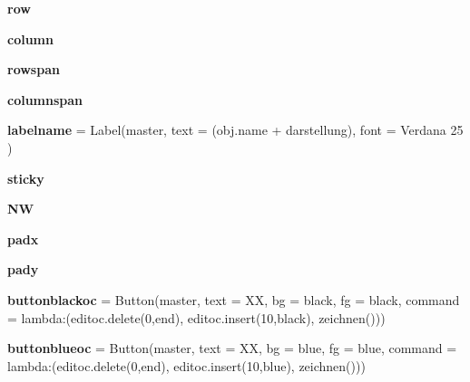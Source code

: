 \begin{DoxyCompactItemize}
\mbox{\label{namespacelatest_abffff8924b3914c7bb914f52eaea798d}} 
{\bfseries row}
\item 
\mbox{\label{namespacelatest_a7cb7a50dbe3c11f25ecb59c589ed31e2}} 
{\bfseries column}
\item 
\mbox{\label{namespacelatest_aaaa697c0f23a70eb61457ba02340661f}} 
{\bfseries rowspan}
\item 
\mbox{\label{namespacelatest_ae8a1bd2d833c82ed64fa953baaf500b2}} 
{\bfseries columnspan}
\item 
\mbox{\label{namespacelatest_adfae089fb243b971880144e27029bf6c}} 
{\bfseries labelname} = Label(master, text = (obj.\+name + \textquotesingle{}darstellung\textquotesingle{}), font = \textquotesingle{}Verdana 25\textquotesingle{} )
\item 
\mbox{\label{namespacelatest_a84aa4983ea2af0c939019553139b3f04}} 
{\bfseries sticky}
\item 
\mbox{\label{namespacelatest_a888a4bbfe49e70831985214772fc599a}} 
{\bfseries NW}
\item 
\mbox{\label{namespacelatest_a3930271e7cea64541ead22da5ed64a28}} 
{\bfseries padx}
\item 
\mbox{\label{namespacelatest_afdfc453b9a8de650d8b3aab157b0cf5e}} 
{\bfseries pady}
\item 
\mbox{\label{namespacelatest_af3023f7901f732bf38a92be66ec21676}} 
{\bfseries buttonblackoc} = Button(master, text = \textquotesingle{}XX\textquotesingle{}, bg = \textquotesingle{}black\textquotesingle{}, fg = \textquotesingle{}black\textquotesingle{}, command = lambda\+:(editoc.\+delete(0,\textquotesingle{}end\textquotesingle{}), editoc.\+insert(10,\textquotesingle{}black\textquotesingle{}), zeichnen()))
\item 
\mbox{\label{namespacelatest_ab9683d830d41d70bba795e0828359db4}} 
{\bfseries buttonblueoc} = Button(master, text = \textquotesingle{}XX\textquotesingle{}, bg = \textquotesingle{}blue\textquotesingle{}, fg = \textquotesingle{}blue\textquotesingle{}, command = lambda\+:(editoc.\+delete(0,\textquotesingle{}end\textquotesingle{}), editoc.\+insert(10,\textquotesingle{}blue\textquotesingle{}), zeichnen()))

\end{DoxyCompactItemize}
